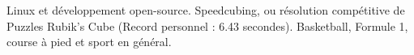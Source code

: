 \documentclass[10pt,a4paper]{article} %
\begin{document}

\spacedhrule{1.6em}{-0.4em} %


{Linux et développement open-source. Speedcubing, ou résolution compétitive de Puzzles Rubik's Cube (Record personnel : 6.43 secondes). Basketball, Formule 1, course à pied et sport en général.}

\end{document}

